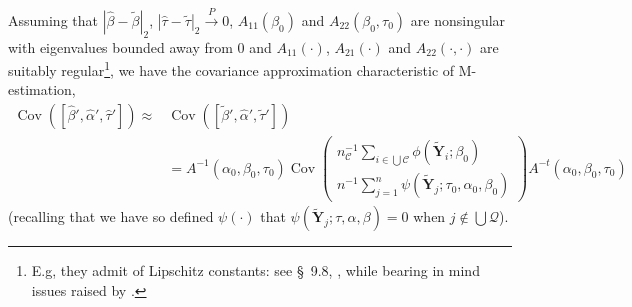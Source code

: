 \documentclass{article}
\begin{document}
Assuming that $|\hat\beta -\tilde\beta|_{2}$, 
$|\hat\tau -\tilde\tau|_{2} \stackrel{P}{\rightarrow} 0$,
$A_{11}(\beta_{0})$ and $A_{22}(\beta_{0}, \tau_{0})$ are nonsingular
with eigenvalues bounded away from 0 and $A_{11}(\cdot)$, $A_{21}(\cdot)$ and $A_{22}(\cdot, \cdot)$ are suitably
regular\footnote{E.g, they admit of Lipschitz constants: see \S~9.8,
  , while bearing in mind issues raised
  by .}, 
we have the covariance approximation characteristic of M-estimation,
\begin{align*} \operatorname{Cov}([\hat\beta',\hat\alpha', \hat\tau']) \approx&
  \operatorname{Cov}([\tilde\beta',\hat\alpha',\tilde\tau'])\\
  &=
  A^{-1}(\alpha_{0}, \beta_{0}, \tau_{0}) \operatorname{Cov}\left(
     \begin{array}{c}
       n_{\mathcal{C}}^{-1}\sum_{i\in \bigcup \mathcal{C}}\phi(\tilde{\mathbf{Y}}_{i}; \beta_{0} )\\
       n^{-1}\sum_{j=1}^{n}\psi(\tilde{\mathbf{Y}}_{j}; \tau_{0}, \alpha_{0}, \beta_{0} )
     \end{array}
\right)A^{-t}(\alpha_{0}, \beta_{0}, \tau_{0})
\end{align*}
(recalling that we have so defined $\psi(\cdot)$ that $\psi(\tilde{\mathbf{Y}}_{j}; \tau, \alpha, \beta) = 0$ when
$j\not\in \bigcup \mathcal{Q}$).
\end{document}
